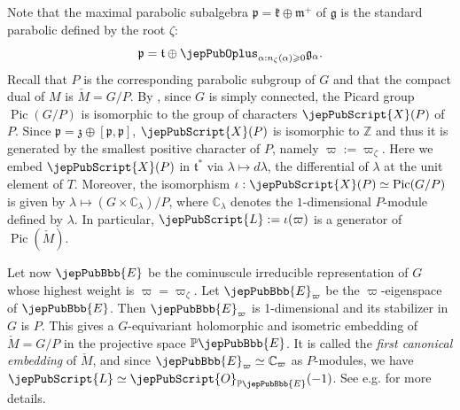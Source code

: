 Note that the maximal parabolic subalgebra $\mathfrak p=\mathfrak k\oplus\mathfrak m^+$ of $\mathfrak g$ is the standard parabolic defined by the root $\zeta$:
\[
\mathfrak p=\mathfrak t\oplus\jepPubOplus_{\alpha:n_\zeta(\alpha)\geqslant0}\mathfrak g_\alpha.
\]
Recall that $P$ is the corresponding parabolic subgroup of $G$ and that the compact dual of $M$ is $\check M=G/P$. By \cite{jep93Mur59}, since $G$ is simply connected, the Picard group $\operatorname{Pic}(G/P)$ is isomorphic to the group of characters $\jepPubScript{X}(P)$ of $P$. Since $\mathfrak p=\mathfrak z\oplus[\mathfrak p,\mathfrak p]$, $\jepPubScript{X}(P)$ is isomorphic to $\mathbb Z$ and thus it is generated by the smallest positive character of $P$, namely $\varpi:=\varpi_\zeta$. Here we embed $\jepPubScript{X}(P)$ in $\mathfrak t^*$ via $\lambda\mapsto d\lambda$, the differential of $\lambda$ at the unit element of $T$. Moreover, the isomorphism $\iota:\jepPubScript{X}(P)\simeq\operatorname{Pic}(G/P)$ is given by $\lambda\mapsto(G\times\mathbb C_\lambda)/P$, where $\mathbb C_\lambda$ denotes the $1$-dimensional $P$-module defined by $\lambda$. In particular, $\jepPubScript{L}:=\iota(\varpi)$ is a generator of $\operatorname{Pic}(\check M)$.

Let now $\jepPubBbb{E}$ be the cominuscule irreducible representation of $G$ whose highest weight is $\varpi=\varpi_\zeta$. Let $\jepPubBbb{E}_\varpi$ be the $\varpi$-eigenspace of $\jepPubBbb{E}$. Then $\jepPubBbb{E}_\varpi$ is 1-dimensional and its stabilizer in $G$ is $P$. This gives a $G$-equivariant holomorphic and isometric embedding of $\check M=G/P$ in the projective space $\mathbb P\jepPubBbb{E}$. It is called the \emph{first canonical embedding} of $\check M$, and since $\jepPubBbb{E}_\varpi\simeq\mathbb C_\varpi$ as $P$-modules, we have $\jepPubScript{L}\simeq\jepPubScript{O}_{\mathbb P\jepPubBbb{E}}(-1)$. See e.g. \cite{jep93NT76} for more details.

